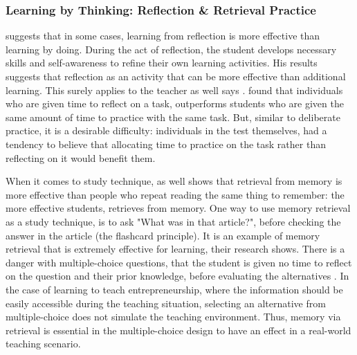   \subsubsection{Learning by Thinking: Reflection \& Retrieval Practice}

  \cite{stefano} suggests that in some cases, learning from reflection is more effective than learning by doing. During the act of reflection, the student develops necessary skills and self-awareness to refine their own learning activities. His results suggests that reflection as an activity that can be more effective than additional learning. This surely applies to the teacher as well says \cite{luckin}. \cite{stefano} found that individuals who are given time to reflect on a task, outperforms students who are given the same amount of time to practice with the same task. But, similar to deliberate practice, it is a desirable difficulty: individuals in the test themselves, had a tendency to believe that allocating time to practice on the task rather than reflecting on it would benefit them.


  When it comes to study technique, \cite{bjork} as well shows that retrieval from memory is more effective than people who repeat reading the same thing to remember: the more effective students, retrieves from memory. One way to use memory retrieval as a study technique, is to ask "What was in that article?", before checking the answer in the article (the flashcard principle). It is an example of memory retrieval that is extremely effective for learning, their research shows. There is a danger with multiple-choice questions, that the student is given no time to reflect on the question and their prior knowledge, before evaluating the alternatives \citep{nicol}. In the case of learning to teach entrepreneurship, where the information should be easily accessible during the teaching situation, selecting an alternative from multiple-choice does not simulate the teaching environment. Thus, memory via retrieval is essential in the multiple-choice design to have an effect in a real-world teaching scenario.



%
